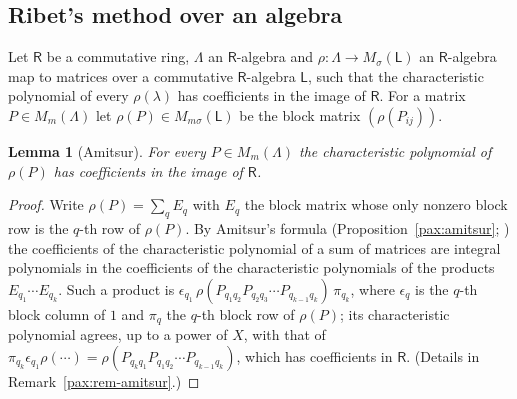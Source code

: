 \documentclass[10pt]{amsart}
\newtheorem{lemma}[theorem]{Lemma}
\theoremstyle{definition}
\theoremstyle{remark}
\begin{document}
\subsection{Ribet's method over an algebra}\label{pri:ss-ribet-alg}

Let $\mathsf R$ be a commutative ring, $\Lambda$ an $\mathsf R$-algebra and $\rho\colon\Lambda\to
M_\sigma(\mathsf L)$ an $\mathsf R$-algebra map to matrices over a commutative $\mathsf
R$-algebra $\mathsf L$, such that the characteristic polynomial of every $\rho(\lambda)$ has
coefficients in the image of $\mathsf R$. For a matrix $P\in M_m(\Lambda)$ let $\rho(P)\in
M_{m\sigma}(\mathsf L)$ be the block matrix $(\rho(P_{ij}))$.

\begin{lemma}[Amitsur]\label{pri:amitsur}
For every $P\in M_m(\Lambda)$ the characteristic polynomial of $\rho(P)$ has coefficients in the
image of $\mathsf R$.
\end{lemma}
\begin{proof}
Write $\rho(P)=\sum_qE_q$ with $E_q$ the block matrix whose only nonzero block row is the $q$-th
row of $\rho(P)$. By Amitsur's formula (Proposition~\ref{pax:amitsur}; \cite{Amitsur}) the coefficients of the characteristic
polynomial of a sum of matrices are integral polynomials in the coefficients of the characteristic
polynomials of the products $E_{q_1}\cdots E_{q_k}$. Such a product is
$\epsilon_{q_1}\,\rho(P_{q_1q_2}P_{q_2q_3}\cdots P_{q_{k-1}q_k})\,\pi_{q_k}$, where $\epsilon_q$ is
the $q$-th block column of $1$ and $\pi_q$ the $q$-th block row of $\rho(P)$; its characteristic
polynomial agrees, up to a power of $X$, with that of $\pi_{q_k}\epsilon_{q_1}\rho(\cdots)=
\rho(P_{q_kq_1}P_{q_1q_2}\cdots P_{q_{k-1}q_k})$, which has coefficients in $\mathsf R$.
(Details in Remark~\ref{pax:rem-amitsur}.)
\end{proof}
\end{document}
